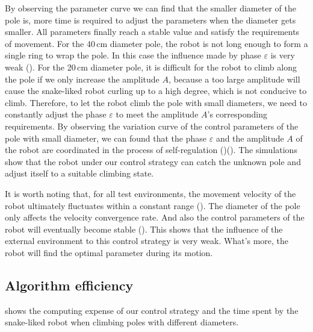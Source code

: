 By observing the parameter curve we can find that the smaller diameter of the pole is, more time is required to adjust the parameters when the diameter gets smaller. All parameters finally reach a stable value and satisfy the requirements of movement. For the 40\,cm diameter pole, the robot is not long enough to form a single ring to wrap the pole. In this case the influence made by phase $\varepsilon$ is very weak (). For the 20\,cm diameter pole, it is difficult for the robot to climb along the pole if we only increase the amplitude $A$, because a too large amplitude will cause the snake-liked robot curling up to a high degree, which is not conducive to climb. Therefore, to let the robot climb the pole with small diameters, we need to constantly adjust the phase $\varepsilon$ to meet the amplitude $A$'s corresponding requirements. By observing the variation curve of the control parameters of the pole with small diameter, we can found that the phase $\varepsilon$ and the amplitude $A$ of the robot are coordinated in the process of self-regulation ()(). The simulations show that the robot under our control strategy can catch the unknown pole and adjust itself to a suitable climbing state.

It is worth noting that, for all test environments, the movement velocity of the robot ultimately fluctuates within a constant range  (). The diameter of the pole only affects the velocity convergence rate. And also the control parameters of the robot will eventually become stable (). This shows that the influence of the external environment to this control strategy is very weak. What's more, the robot will find the optimal parameter during its motion.

\subsection{Algorithm efficiency}
 shows the computing expense of our control strategy  and the time spent by the snake-liked robot when climbing poles with different diameters.

